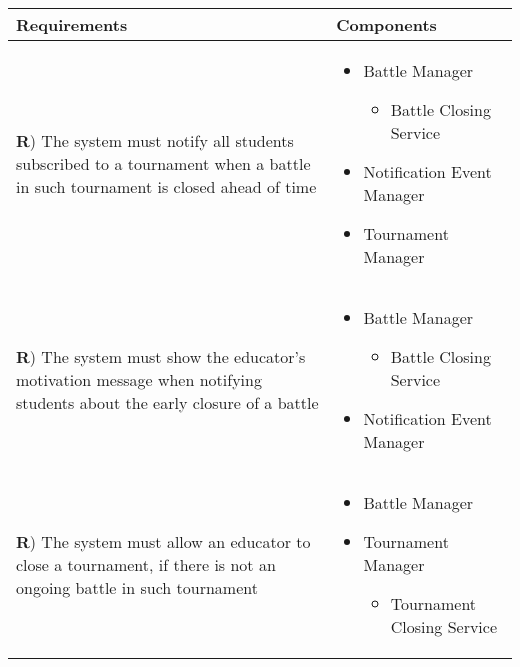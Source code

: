 \documentclass[../DD.tex]{subfiles}
\newcounter{rown}
\newcommand{\rowIndex}{\arabic{rown}\stepcounter{rown}}
\begin{document}
    \begin{table}[h!]
        \begin{center}
            \hspace*{-2cm}
            \begin{tabular}{|m{20em}|m{20em}|}
            \hline
            \textbf{Requirements} & \textbf{Components}\\
            \hline
            \textbf{R\rowIndex}) The system must notify all students subscribed to a tournament when a battle in such tournament is closed ahead of time & \begin{itemize}
                \item Battle Manager
                \begin{itemize}
                    \item Battle Closing Service
                \end{itemize}
                \item Notification Event Manager
                \item Tournament Manager
            \end{itemize}\\
            \hline
            \textbf{R\rowIndex}) The system must show the educator's motivation message when notifying students about the early closure of a battle & \begin{itemize}
                \item Battle Manager
                \begin{itemize}
                    \item Battle Closing Service
                \end{itemize}
                \item Notification Event Manager
            \end{itemize}\\
            \hline
            \textbf{R\rowIndex}) The system must allow an educator to close a tournament, if there is not an ongoing battle in such tournament & \begin{itemize}
                \item Battle Manager
                \item Tournament Manager
                \begin{itemize}
                    \item Tournament Closing Service
                \end{itemize} 

\end{itemize}
\end{tabular}
\end{center}
\end{table}
\end{document}
